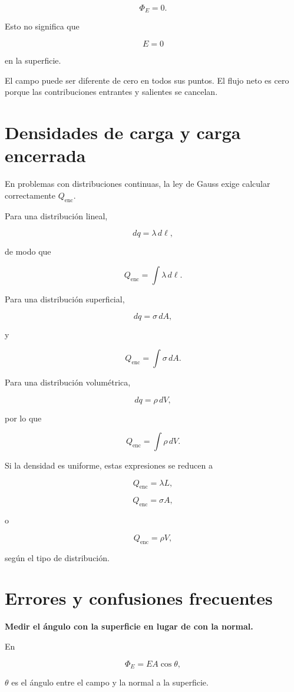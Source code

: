 \[
\boxed{\Phi_E=0}.
\]

Esto no significa que

\[
E=0
\]

en la superficie.

El campo puede ser diferente de cero en todos sus puntos. El flujo neto es cero porque
las contribuciones entrantes y salientes se cancelan.


\section{Densidades de carga y carga encerrada}

En problemas con distribuciones continuas, la ley de Gauss exige calcular
correctamente \(Q_{\text{enc}}\).

Para una distribución lineal,

\[
dq=\lambda\,d\ell,
\]

de modo que

\[
\boxed{
Q_{\text{enc}}=\int\lambda\,d\ell
}.
\]

Para una distribución superficial,

\[
dq=\sigma\,dA,
\]

y

\[
\boxed{
Q_{\text{enc}}=\int\sigma\,dA
}.
\]

Para una distribución volumétrica,

\[
dq=\rho\,dV,
\]

por lo que

\[
\boxed{
Q_{\text{enc}}=\int\rho\,dV
}.
\]

Si la densidad es uniforme, estas expresiones se reducen a

\[
Q_{\text{enc}}=\lambda L,
\]

\[
Q_{\text{enc}}=\sigma A,
\]

o

\[
Q_{\text{enc}}=\rho V,
\]

según el tipo de distribución.


\section{Errores y confusiones frecuentes}

\begin{errorfrecuente}

\textbf{Medir el ángulo con la superficie en lugar de con la normal.}

En

\[
\Phi_E=EA\cos\theta,
\]

\(\theta\) es el ángulo entre el campo y la normal a la superficie.

\end{errorfrecuente}



